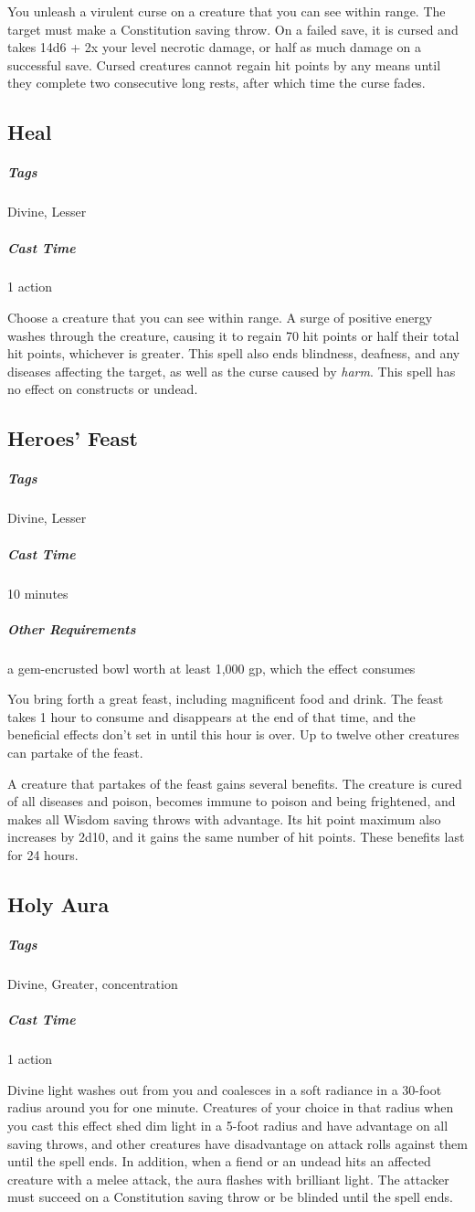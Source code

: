 You unleash a virulent curse on a creature that you can see within range. The target must make a Constitution saving throw. On a failed save, it is cursed and takes 14d6 + 2x your level necrotic damage, or half as much damage on a successful save. Cursed creatures cannot regain hit points by any means until they complete two consecutive long rests, after which time the curse fades.

\subsection{Heal}\label{spell:heal}
\subparagraph*{Tags} Divine, Lesser
\subparagraph*{Cast Time} 1 action

Choose a creature that you can see within range. A surge of positive energy washes through the creature, causing it to regain 70 hit points or half their total hit points, whichever is greater. This spell also ends blindness, deafness, and any diseases affecting the target, as well as the curse caused by \textit{harm}. This spell has no effect on constructs or undead.

\subsection{Heroes' Feast}\label{spell:heroes-feast}
\subparagraph*{Tags} Divine, Lesser
\subparagraph*{Cast Time} 10 minutes
\subparagraph*{Other Requirements} a gem-encrusted bowl worth at least 1,000 gp, which the effect consumes

You bring forth a great feast, including magnificent food and drink. The feast takes 1 hour to consume and disappears at the end of that time, and the beneficial effects don't set in until this hour is over. Up to twelve other creatures can partake of the feast.

A creature that partakes of the feast gains several benefits. The creature is cured of all diseases and poison, becomes immune to poison and being frightened, and makes all Wisdom saving throws with advantage. Its hit point maximum also increases by 2d10, and it gains the same number of hit points. These benefits last for 24 hours.

\subsection{Holy Aura}\label{spell:holy-aura}
\subparagraph*{Tags} Divine, Greater, concentration
\subparagraph*{Cast Time} 1 action

Divine light washes out from you and coalesces in a soft radiance in a 30-foot radius around you for one minute. Creatures of your choice in that radius when you cast this effect shed dim light in a 5-foot radius and have advantage on all saving throws, and other creatures have disadvantage on attack rolls against them until the spell ends. In addition, when a fiend or an undead hits an affected creature with a melee attack, the aura flashes with brilliant light. The attacker must succeed on a Constitution saving throw or be blinded until the spell ends.

